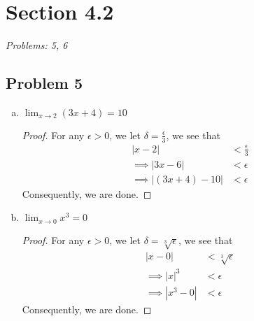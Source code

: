 \documentclass[12pt]{article}
\begin{document}

\section*{Section 4.2}
\textit{Problems: 5, 6}
\subsection*{Problem 5}
\begin{enumerate}[a).]
    \item {
        $\lim_{x \rightarrow 2}(3x + 4) = 10$
        \begin{proof}
            For any $\epsilon > 0$, we let $\delta = \frac{\epsilon}{3}$, we see that 
            \begin{align*}
                |x - 2| &< \frac{\epsilon}{3} \\
                \implies |3x - 6| &< \epsilon \\
                \implies |(3x+4) - 10| &< \epsilon 
            \end{align*}
            Consequently, we are done. 
        \end{proof}
    }
    \item {
        $\lim_{x \rightarrow 0} x^3 = 0 $
        \begin{proof}
            For any $\epsilon > 0$, we let $\delta = \sqrt[3]{\epsilon}$, we see that
            \begin{align*}
                |x - 0| &< \sqrt[3]{\epsilon} \\
                \implies |x|^3 &< \epsilon \\
                \implies |x^3 - 0| &< \epsilon
            \end{align*}
            Consequently, we are done. 
        \end{proof}
    }
\end{enumerate}
\end{document}

